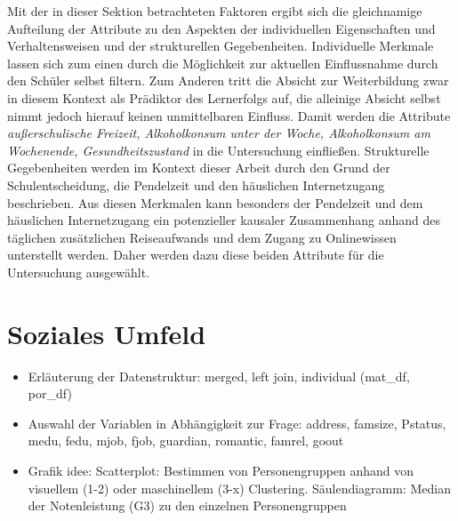 Mit der in dieser Sektion betrachteten Faktoren ergibt sich die gleichnamige Aufteilung der Attribute zu den Aspekten der individuellen Eigenschaften und Verhaltensweisen und der strukturellen Gegebenheiten.
Individuelle Merkmale lassen sich zum einen durch die Möglichkeit zur aktuellen Einflussnahme durch den Schüler selbst filtern.
Zum Anderen tritt die Absicht zur Weiterbildung zwar in diesem Kontext als Prädiktor des Lernerfolgs auf, die alleinige Absicht selbst nimmt jedoch hierauf keinen unmittelbaren Einfluss.
Damit werden die Attribute \textit{außerschulische Freizeit, Alkoholkonsum unter der Woche, Alkoholkonsum am Wochenende, Gesundheitszustand} in die Untersuchung einfließen.
Strukturelle Gegebenheiten werden im Kontext dieser Arbeit durch den Grund der Schulentscheidung, die Pendelzeit und den häuslichen Internetzugang beschrieben.
Aus diesen Merkmalen kann besonders der Pendelzeit und dem häuslichen Internetzugang ein potenzieller kausaler Zusammenhang anhand des täglichen zusätzlichen Reiseaufwands und dem Zugang zu Onlinewissen unterstellt werden.
Daher werden dazu diese beiden Attribute für die Untersuchung ausgewählt.

\section{Soziales Umfeld}

\begin{itemize}
    \item Erläuterung der Datenstruktur: merged, left join, individual (mat\_df, por\_df)
    \item Auswahl der Variablen in Abhängigkeit zur Frage:
    \subitem address, famsize, Pstatus, medu, fedu, mjob, fjob, guardian, romantic, famrel, goout
    \item Grafik idee:
    \subitem Scatterplot: Bestimmen von Personengruppen anhand von visuellem (1-2) oder maschinellem (3-x) Clustering.
    \subitem Säulendiagramm: Median der Notenleistung (G3) zu den einzelnen Personengruppen
\end{itemize}

